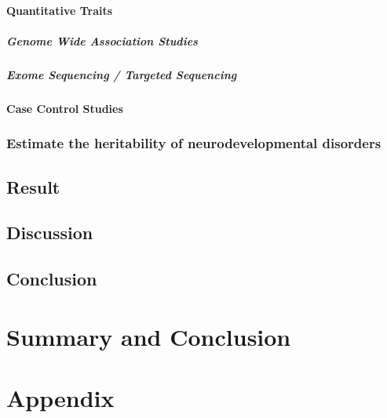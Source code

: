 \documentclass{report}
\begin{document}
\subsubsection{Quantitative Traits}
\paragraph{Genome Wide Association Studies}
\paragraph{Exome Sequencing / Targeted Sequencing}
\subsubsection{Case Control Studies}

\subsection{Estimate the heritability of neurodevelopmental disorders}
\section{Result}
\section{Discussion}



\section{Conclusion}


\chapter{Summary and Conclusion}


\printbibliography

\chapter*{Appendix}
\end{document}

